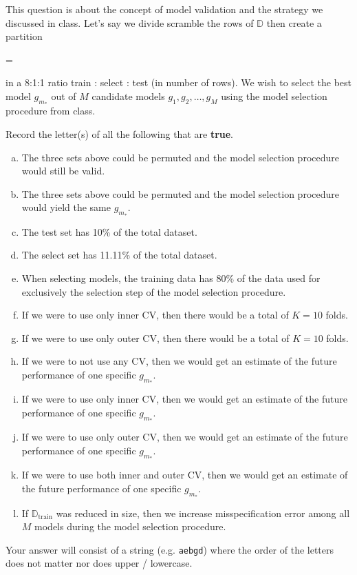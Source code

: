 \documentclass[12pt]{article}
\newcommand{\instr}{\small Your answer will consist of a string (e.g. \texttt{aebgd}) where the order of the letters does not matter nor does upper / lowercase. \normalsize}
\begin{document}



\problem This question is about the concept of model validation and the strategy we discussed in class. Let's say we divide scramble the rows of $\mathbb{D}$ then create a partition 

\beqn
{} = 
\eeqn

\noindent in a 8:1:1 ratio train : select : test (in number of rows). We wish to select the best model $g_{m_*}$ out of $M$ candidate models $g_1, g_2, \ldots, g_M$ using the model selection procedure from class.

\benum
{} Record the letter(s) of all the following that are \textbf{true}. 


\begin{enumerate}[(a)]
\item The three sets above could be permuted and the model selection procedure would still be valid.
\item The three sets above could be permuted and the model selection procedure would yield the same $g_{m_*}$.
\item The test set has 10\% of the total dataset.
\item The select set has 11.11\% of the total dataset.
\item When selecting models, the training data has 80\% of the data used for exclusively the selection step of the model selection procedure.
\item If we were to use only inner CV, then there would be a total of $K = 10$ folds.
\item If we were to use only outer CV, then there would be a total of $K = 10$ folds.
\item If we were to not use any CV, then we would get an estimate of the future performance of one specific $g_{m_*}$.
\item If we were to use only inner CV, then we would get an estimate of the future performance of one specific $g_{m_*}$.
\item If we were to use only outer CV, then we would get an estimate of the future performance of one specific $g_{m_*}$.
\item If we were to use both inner and outer CV, then we would get an estimate of the future performance of one specific $g_{m_*}$.
\item If $\mathbb{D}_{\text{train}}$ was reduced in size, then we increase misspecification error among all $M$ models during the model selection procedure.
\end{enumerate}
\eenum\instr\pagebreak
\end{document}

